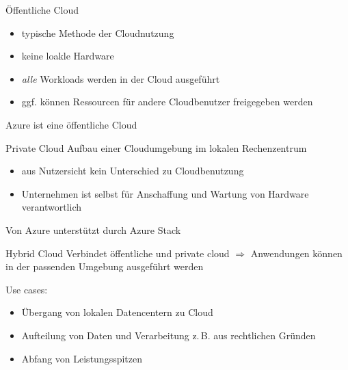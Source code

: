 
\begin{flashcard}[Describe]{Öffentliche Cloud}
    \begin{itemize}
        \item typische Methode der Cloudnutzung
        \item keine loakle Hardware
        \item \emph{alle} Workloads werden in der Cloud ausgeführt
        \item ggf. können Ressourcen für andere Cloudbenutzer freigegeben werden
    \end{itemize}

    \vspace{5mm}
    Azure ist eine öffentliche Cloud
\end{flashcard}

\begin{flashcard}[Describe]{Private Cloud}
    Aufbau einer Cloudumgebung im lokalen Rechenzentrum

    \begin{itemize}
        \item aus Nutzersicht kein Unterschied zu Cloudbenutzung
        \item Unternehmen ist selbst für Anschaffung und Wartung von Hardware verantwortlich
    \end{itemize}

    \vspace{5mm}
    Von Azure unterstützt durch Azure Stack

\end{flashcard}

\begin{flashcard}[Describe]{Hybrid Cloud}
    Verbindet öffentliche und private cloud\newline
    $\Rightarrow$ Anwendungen können in der passenden Umgebung ausgeführt werden

    \vspace{5mm}
    Use cases:
    \begin{itemize}
        \item Übergang von lokalen Datencentern zu Cloud
        \item Aufteilung von Daten und Verarbeitung z.\,B. aus rechtlichen Gründen
        \item Abfang von Leistungsspitzen
    \end{itemize}

\end{flashcard}


